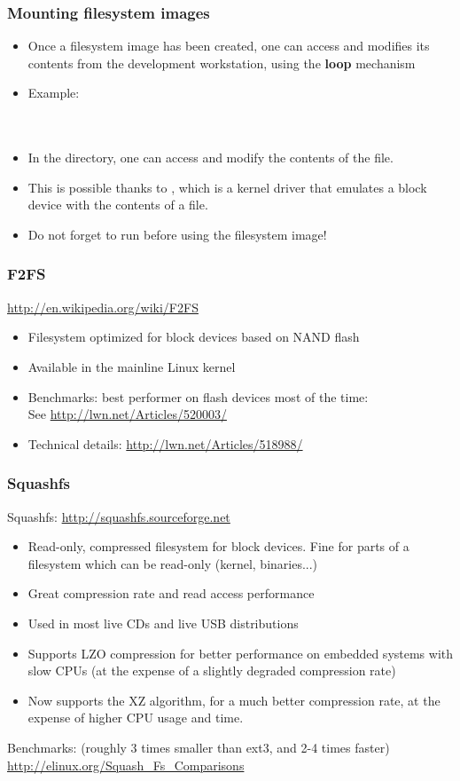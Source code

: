 \begin{frame}
  \frametitle{Mounting filesystem images}
  \begin{itemize}
  \item Once a filesystem image has been created, one can access and
    modifies its contents from the development workstation, using the
    {\bf loop} mechanism
  \item Example:\\
    \\
    \\
  \item In the  directory, one can access and modify
    the contents of the  file.
  \item This is possible thanks to , which is a kernel
    driver that emulates a block device with the contents of a file.
  \item Do not forget to run  before using the filesystem
    image!
  \end{itemize}
\end{frame}

\begin{frame}
  \frametitle{F2FS}
  \url{http://en.wikipedia.org/wiki/F2FS}
  \begin{itemize}
  \item Filesystem optimized for block devices based on NAND flash
  \item Available in the mainline Linux kernel
  \item Benchmarks: best performer on flash devices most of the time: \\
        See \url{http://lwn.net/Articles/520003/}
  \item Technical details: \url{http://lwn.net/Articles/518988/}
  \end{itemize}
\end{frame}

\begin{frame}
  \frametitle{Squashfs}
  Squashfs: \url{http://squashfs.sourceforge.net}
  \begin{itemize}
  \item Read-only, compressed filesystem for block devices. Fine for
    parts of a filesystem which can be read-only (kernel, binaries...)
  \item Great compression rate and read access performance
  \item Used in most live CDs and live USB distributions
  \item Supports LZO compression for better performance on embedded
    systems with slow CPUs (at the expense of a slightly degraded
    compression rate)
  \item Now supports the XZ algorithm, for a much better compression
        rate, at the expense of higher CPU usage and time.
  \end{itemize}
  Benchmarks: (roughly 3 times smaller than ext3, and 2-4 times faster)\\
  \url{http://elinux.org/Squash_Fs_Comparisons}
\end{frame}


